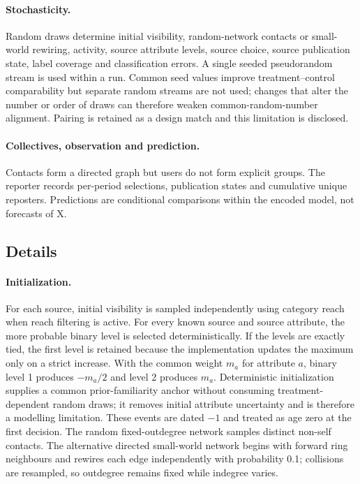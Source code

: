 \paragraph{Stochasticity.} Random draws determine initial visibility, random-network contacts or small-world rewiring, activity, source attribute levels, source choice, source publication state, label coverage and classification errors. A single seeded pseudorandom stream is used within a run. Common seed values improve treatment--control comparability but separate random streams are not used; changes that alter the number or order of draws can therefore weaken common-random-number alignment. Pairing is retained as a design match and this limitation is disclosed.

\paragraph{Collectives, observation and prediction.} Contacts form a directed graph but users do not form explicit groups. The reporter records per-period selections, publication states and cumulative unique reposters. Predictions are conditional comparisons within the encoded model, not forecasts of X.

\subsection{Details}

\paragraph{Initialization.} For each source, initial visibility is sampled independently using category reach when reach filtering is active. For every known source and source attribute, the more probable binary level is selected deterministically. If the levels are exactly tied, the first level is retained because the implementation updates the maximum only on a strict increase. With the common weight $m_a$ for attribute $a$, binary level 1 produces $-m_a/2$ and level 2 produces $m_a$. Deterministic initialization supplies a common prior-familiarity anchor without consuming treatment-dependent random draws; it removes initial attribute uncertainty and is therefore a modelling limitation. These events are dated $-1$ and treated as age zero at the first decision. The random fixed-outdegree network samples distinct non-self contacts. The alternative directed small-world network begins with forward ring neighbours and rewires each edge independently with probability 0.1; collisions are resampled, so outdegree remains fixed while indegree varies.

